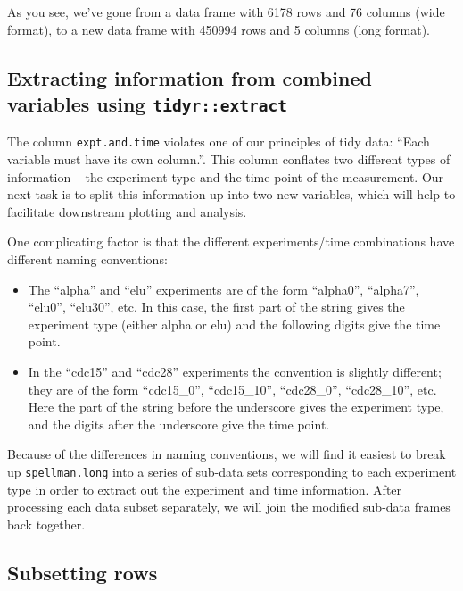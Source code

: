 \documentclass[]{book}
\theoremstyle{definition}
\theoremstyle{definition}
\theoremstyle{definition}
\theoremstyle{remark}
\begin{document}
As you see, we've gone from a data frame with 6178 rows and 76 columns
(wide format), to a new data frame with 450994 rows and 5 columns (long
format).

\hypertarget{extracting-information-from-combined-variables-using-tidyrextract}{%
\subsection{\texorpdfstring{Extracting information from combined
variables using
\texttt{tidyr::extract}}{Extracting information from combined variables using tidyr::extract}}\label{extracting-information-from-combined-variables-using-tidyrextract}}

The column \texttt{expt.and.time} violates one of our principles of tidy
data: ``Each variable must have its own column.''. This column conflates
two different types of information -- the experiment type and the time
point of the measurement. Our next task is to split this information up
into two new variables, which will help to facilitate downstream
plotting and analysis.

One complicating factor is that the different experiments/time
combinations have different naming conventions:

\begin{itemize}
\item
  The ``alpha'' and ``elu'' experiments are of the form ``alpha0'',
  ``alpha7'', ``elu0'', ``elu30'', etc. In this case, the first part of
  the string gives the experiment type (either alpha or elu) and the
  following digits give the time point.
\item
  In the ``cdc15'' and ``cdc28'' experiments the convention is slightly
  different; they are of the form ``cdc15\_0'', ``cdc15\_10'',
  ``cdc28\_0'', ``cdc28\_10'', etc. Here the part of the string before
  the underscore gives the experiment type, and the digits after the
  underscore give the time point.
\end{itemize}

Because of the differences in naming conventions, we will find it
easiest to break up \texttt{spellman.long} into a series of sub-data
sets corresponding to each experiment type in order to extract out the
experiment and time information. After processing each data subset
separately, we will join the modified sub-data frames back together.

\hypertarget{subsetting-rows}{%
\subsection{Subsetting rows}\label{subsetting-rows}}
\end{document}
